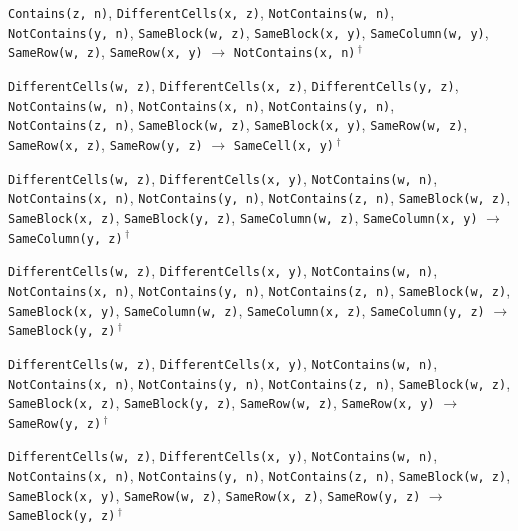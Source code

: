 \documentclass[11pt,a4paper]{article}
\theoremstyle{definition}
\theoremstyle{remark}
\begin{document}
{\begin{enumerate}[label={[\arabic*]},leftmargin=2.6em,itemsep=1pt]
  \item \texttt{Contains(z,~n)}, \allowbreak \texttt{DifferentCells(x,~z)}, \allowbreak \texttt{NotContains(w,~n)}, \allowbreak \texttt{NotContains(y,~n)}, \allowbreak \texttt{SameBlock(w,~z)}, \allowbreak \texttt{SameBlock(x,~y)}, \allowbreak \texttt{SameColumn(w,~y)}, \allowbreak \texttt{SameRow(w,~z)}, \allowbreak \texttt{SameRow(x,~y)} \;$\to$\; \texttt{NotContains(x,~n)}\,$^{\dagger}$
  \item \texttt{DifferentCells(w,~z)}, \allowbreak \texttt{DifferentCells(x,~z)}, \allowbreak \texttt{DifferentCells(y,~z)}, \allowbreak \texttt{NotContains(w,~n)}, \allowbreak \texttt{NotContains(x,~n)}, \allowbreak \texttt{NotContains(y,~n)}, \allowbreak \texttt{NotContains(z,~n)}, \allowbreak \texttt{SameBlock(w,~z)}, \allowbreak \texttt{SameBlock(x,~y)}, \allowbreak \texttt{SameRow(w,~z)}, \allowbreak \texttt{SameRow(x,~z)}, \allowbreak \texttt{SameRow(y,~z)} \;$\to$\; \texttt{SameCell(x,~y)}\,$^{\dagger}$
  \item \texttt{DifferentCells(w,~z)}, \allowbreak \texttt{DifferentCells(x,~y)}, \allowbreak \texttt{NotContains(w,~n)}, \allowbreak \texttt{NotContains(x,~n)}, \allowbreak \texttt{NotContains(y,~n)}, \allowbreak \texttt{NotContains(z,~n)}, \allowbreak \texttt{SameBlock(w,~z)}, \allowbreak \texttt{SameBlock(x,~z)}, \allowbreak \texttt{SameBlock(y,~z)}, \allowbreak \texttt{SameColumn(w,~z)}, \allowbreak \texttt{SameColumn(x,~y)} \;$\to$\; \texttt{SameColumn(y,~z)}\,$^{\dagger}$
  \item \texttt{DifferentCells(w,~z)}, \allowbreak \texttt{DifferentCells(x,~y)}, \allowbreak \texttt{NotContains(w,~n)}, \allowbreak \texttt{NotContains(x,~n)}, \allowbreak \texttt{NotContains(y,~n)}, \allowbreak \texttt{NotContains(z,~n)}, \allowbreak \texttt{SameBlock(w,~z)}, \allowbreak \texttt{SameBlock(x,~y)}, \allowbreak \texttt{SameColumn(w,~z)}, \allowbreak \texttt{SameColumn(x,~z)}, \allowbreak \texttt{SameColumn(y,~z)} \;$\to$\; \texttt{SameBlock(y,~z)}\,$^{\dagger}$
  \item \texttt{DifferentCells(w,~z)}, \allowbreak \texttt{DifferentCells(x,~y)}, \allowbreak \texttt{NotContains(w,~n)}, \allowbreak \texttt{NotContains(x,~n)}, \allowbreak \texttt{NotContains(y,~n)}, \allowbreak \texttt{NotContains(z,~n)}, \allowbreak \texttt{SameBlock(w,~z)}, \allowbreak \texttt{SameBlock(x,~z)}, \allowbreak \texttt{SameBlock(y,~z)}, \allowbreak \texttt{SameRow(w,~z)}, \allowbreak \texttt{SameRow(x,~y)} \;$\to$\; \texttt{SameRow(y,~z)}\,$^{\dagger}$
  \item \texttt{DifferentCells(w,~z)}, \allowbreak \texttt{DifferentCells(x,~y)}, \allowbreak \texttt{NotContains(w,~n)}, \allowbreak \texttt{NotContains(x,~n)}, \allowbreak \texttt{NotContains(y,~n)}, \allowbreak \texttt{NotContains(z,~n)}, \allowbreak \texttt{SameBlock(w,~z)}, \allowbreak \texttt{SameBlock(x,~y)}, \allowbreak \texttt{SameRow(w,~z)}, \allowbreak \texttt{SameRow(x,~z)}, \allowbreak \texttt{SameRow(y,~z)} \;$\to$\; \texttt{SameBlock(y,~z)}\,$^{\dagger}$

\end{enumerate}}
\end{document}
